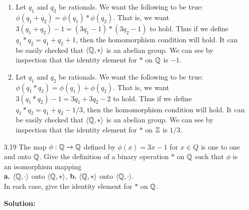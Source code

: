 \begin{enumerate}
      \begin{enumerate}
         \item Let $q_1$ and $q_2$ be rationals. We want the following to be
               true: $\phi(q_1 + q_2) = \phi(q_1) * \phi(q_2)$. That is, we want
               $3(q_1 + q_2) - 1 = (3q_1 - 1) * (3q_2 - 1)$ to hold. Thus if we 
               define $q_1 * q_2 = q_1 + q_2 + 1$, then the homomorphism 
               condition will hold. It can be easily checked that $\langle \mathbb{Q}, * \rangle$ 
               is an abelian group. We can see by inspection that the identity 
               element for $*$ on $\mathbb{Q}$ is $-1$.
         \item Let $q_1$ and $q_2$ be rationals. We want the following to be
               true: $\phi(q_1 * q_2) = \phi(q_1) + \phi(q_2)$. That is, we want
               $3(q_1 * q_2) - 1 = 3q_1 + 3q_2 - 2$ to hold. Thus if we 
               define $q_1 * q_2 = q_1 + q_2 - 1/3$, then the homomorphism 
               condition will hold. It can be easily checked that $\langle \mathbb{Q}, * \rangle$ 
               is an abelian group. We can see by inspection that the identity 
               element for $*$ on $\mathbb{Z}$ is $1/3$.
      \end{enumerate}
   \item[3.19] The map $\phi : \mathbb{Q} \rightarrow \mathbb{Q}$ defined by $\phi(x) = 3x - 1$
               for $x \in Q$ is one to one and onto $\mathbb{Q}$. Give the definition
               of a binary operation $*$ on $\mathbb{Q}$ such that $\phi$ is an
               isomorphism mapping \\
               \textbf{a.} $\langle \mathbb{Q}, \cdot \rangle$ onto $\langle \mathbb{Q}, * \rangle$,
               \qquad\qquad\qquad\qquad\qquad\qquad\qquad\qquad
               \textbf{b.} $\langle \mathbb{Q}, * \rangle$ onto $\langle \mathbb{Q}, \cdot \rangle$. \\
               In each case, give the identity element for $*$ on $\mathbb{Q}$.

      \textbf{Solution:}


\end{enumerate}
